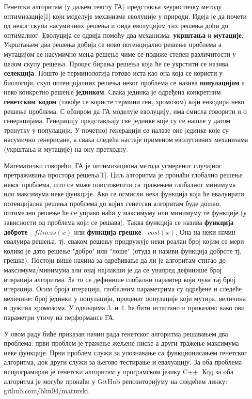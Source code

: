 \documentclass{article}
\begin{document}
Генетски алгоритам (у даљем тексту ГА) представља хеуристичку методу оптимизације[1] који моделује
механизме еволуције у природи. Идеја је да почети од неког скупа насумичних решења и онда
еволуцијом тих решења доћи до оптималног. Еволуција се одвија помоћу два механизма: \textbf{укрштања}
и \textbf{мутације}. Укрштањем два решења добија се ново потенцијално решење проблема а мутацијом се насумично мења решење чиме
се подиже степен различитости у целом скупу решења. Процес бирања решења која ће се укрстити се назива 
\textbf{селекција}. Пошто је терминологија готово иста као она која се користи у биологији, скуп потенцијалних 
решења неког проблема се назива \textbf{популацијом} а неко конкретно решење \textbf{јединком}. 
Свака јединка је одређена конкретним \textbf{генетским кодом} (такође се користе термини ген, хромозом) који енкодира неко
решење проблема. С обзиром да  ГА моделује еволуцију, има смисла говорити и о генерацијама. Генерацију 
представљају све јединке које су се нашле у датом тренутку у популацији. У почетној генерацији се 
налазе оне јединке које су насумично генерисане, а свака следећа настаје применом еволутивних 
механизама (укрштања и мутације) на ону претходну. 

Математички говорећи, ГА је оптимизациона метода усмереног случајног претраживања
простора решења[1]. Циљ алгоритма је пронаћи глобално решење неког проблема, што се 
може поистоветити са тражењем глобалног минимума или максимума неке функције. Ако
се осмисли нека функција која ће евалуирати потенцијална решења проблема до којих 
генетски алгоритам буде дошао, оптимално решење ће се управо наћи у максимуму или
минимуму те функције (у зависности од проблема који се решава). Таква функција се назива \textbf{функција доброте} - 
$fitness(x)$ или \textbf{функција грешке} - $cost(x)$. Она на неки начин евалуира решења, 
тј. сваком решењу придружује неки реалан број којим се мери колико је дато решење "добро"  или "лоше" 
(отуда и називи функција доброте тј. грешке). Постоји више начина за одређивање да ли је алгоритам стигао до максимума/минимума али 
онај најлакши је да се унапред дефинише број итерација алгоритма. За то
се дефинише глобални парамтер који чува тај број итерација. Осим броја итерација, глобалним 
параметрима су одређене и следеће величине: број јединки у популацији, проценат популације који мутира, величина и дужина хромозома. 
У одељцима 3. и 4. ће бити испитано и приказано како ови параметри утичу на перформансе ГА.

У овом раду биће приказан начин рада генетског алгоритма решавањем два проблема: први проблем
је тражење жељене ниске а други тражење максимума неке функције. Први проблем служи за 
упознавање са функционисањем генетског алгоритма, док други служи за његово тестирање и 
евалуацију. За оба проблема испрограмиран је генетски алгоритам у програмском језику 
C++. Код за оба алгоритма је могуће пронаћи у GitHub репозиторијуму на следећем
линку: \url{github.com/blin04/maturski}.
\end{document}
